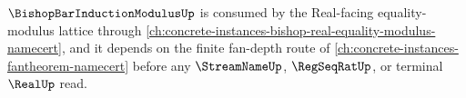 $\BishopBarInductionModulusUp$ is consumed by the Real-facing equality-modulus lattice through \autoref{ch:concrete-instances-bishop-real-equality-modulus-namecert}, and it depends on the finite fan-depth route of \autoref{ch:concrete-instances-fantheorem-namecert} before any $\StreamNameUp$, $\RegSeqRatUp$, or terminal $\RealUp$ read.



